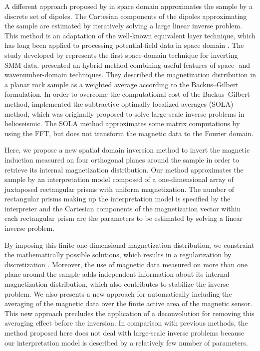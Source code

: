 \documentclass[galley,gc]{agutex}
\begin{document}
\begin{article}
A different approach proposed by \citep{weiss2007} in space domain
approximates the sample by a discrete set of dipoles.
The Cartesian components of the dipoles approximating the sample
are estimated by iteratively solving a large linear inverse problem.
This method is an adaptation of the well-known equivalent
layer technique, which has long been applied to processing
potential-field data in space domain \citep{dampney1969, emilia1973, 
vonfrese-etal1981, hansen-miyazaki1984, silva1986, leao-silva1989, 
cordell1992, mendonca1992, mendonca-silva1994, mendonca-silva1995,
guspi-novara2009, li-oldenburg2010, barnes-lumley2011, 
oliveirajr-etal2013, kara-etal2014, li-nabighian-oldenburg2014,
barnes2014}.
The study developed by \citep{weiss2007} represents the first
space-domain technique for inverting SMM data.
\citet{usui2012} presented an hybrid method combining
useful features of space- and wavenumber-domain techniques.
They described the magnetization distribution in a planar
rock sample as a weighted average according to the 
Backus–Gilbert formulation.
In order to overcome the computational cost of the 
Backus–Gilbert method, \citet{usui2012} implemented 
the subtractive optimally localized averages (SOLA) 
method, which was originally proposed to solve
large-scale inverse problems in helioseismic.
The SOLA method approximates some matrix computations 
by using the FFT, but does not transform the magnetic 
data to the Fourier domain.

Here, we propose a new spatial domain inversion
method to invert the magnetic induction measured on four 
orthogonal planes around the sample in order to retrieve its internal
magnetization distribution. 
Our method approximates the sample by an interpretation model 
composed of a one-dimensional array of juxtaposed rectangular 
prisms with uniform magnetization.
The number of rectangular prisms making 
up the interpretation model is specified by the interpreter and
the Cartesian components of the magnetization vector within 
each rectangular prism are the parameters to be estimated by 
solving a linear inverse problem.

By imposing this finite one-dimensional magnetization distribution, 
we constraint the mathematically possible solutions, which results
in a regularization by discretization \citep{engl1996, aster2005}.
Moreover, the use of magnetic data measured on more than one
plane around the sample adds independent information about
its internal magnetization distribution, which also contributes
to stabilize the inverse problem.
We also presents a new approach for automatically including the
averaging of the magnetic data over the finite active area of
the magnetic sensor.
This new approach precludes the application of a deconvolution
for removing this averaging effect before the inversion.
In comparison with previous methods,
the method proposed here does not deal with large-scale inverse problems 
because our interpretation model is described by a relatively 
few number of parameters.


\end{article}
\end{document}
